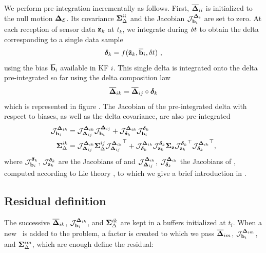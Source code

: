 We perform pre-integration incrementally as follows. 
First, $\overline{{\bm \Delta}}_{ii}$ is initialized to the null motion ${\bm \Delta}_{\mathcal{E}}$. 
Its covariance ${\bm \Sigma}_\Delta^{ii}$ and the Jacobian ${\mathcal{J}^{{\bm \Delta}_i}_{{\bf b}_i}}$ are set to zero. 
At each reception of sensor data $\tilde{{\bf z}}_k$ at $t_k$, we integrate during $\delta t$ to obtain the delta corresponding to a single data sample
%
\begin{equation}
    \bm\delta_k = f(\tilde{{\bf z}}_k, \overline{{\bf b}}_i, \delta t)~, 
    \label{eq:data2delta}
\end{equation}
%
using the bias $\overline{{\bf b}}_i$ available in KF $i$. 
This single delta is integrated onto the delta pre-integrated so far using the delta composition law
%
\begin{equation}
    \overline{{\bm \Delta}}_{ik} = \overline{{\bm \Delta}}_{ij} \circ \bm\delta_k 
    \label{eq:deltaPlusDelta}
\end{equation}
%
which is represented in figure .
The Jacobian of the pre-integrated delta with respect to biases, as well as the delta covariance, are also pre-integrated
%
\begin{align}
    {\mathcal{J}^{{\bm \Delta}_{ik}}_{{\bf b}_i}} &= {\mathcal{J}^{{\bm \Delta}_{ik}}_{{\bm \Delta}_{ij}}}{\mathcal{J}^{{\bm \Delta}_{ij}}_{{\bf b}_i}} 
+ {\mathcal{J}^{{\bm \Delta}_{ik}}_{\bm\delta_k}}{\mathcal{J}^{\bm\delta_k}_{{\bf b}_i}} \\
    {\bm \Sigma}_\Delta^{ik} &= {\mathcal{J}^{{\bm \Delta}_{ik}}_{{\bm \Delta}_{ij}}}{\bm \Sigma}_\Delta^{ij}{\mathcal{J}^{{\bm \Delta}_{ik}}_{{\bm \Delta}_{ij}}}^{\top} 
+ {\mathcal{J}^{{\bm \Delta}_{ik}}_{\bm\delta_k}}{\mathcal{J}^{\bm\delta_k}_{{\bf z}_k}}{\bm \Sigma}_{\bf z}{\mathcal{J}^{\bm\delta_k}_{{\bf z}_k}}^{\top}{\mathcal{J}^{{\bm \Delta}_{ik}}_{\bm\delta_k}}^{\top},
\end{align}
%
where ${\mathcal{J}^{\bm\delta_k}_{{\bf b}_i}}$, ${\mathcal{J}^{\bm\delta_k}_{{\bf z}_k}}$ are the Jacobians of  and ${\mathcal{J}^{{\bm \Delta}_{ik}}_{{\bm \Delta}_{ij}}}$, ${\mathcal{J}^{{\bm \Delta}_{ik}}_{\bm\delta_k}}$ the Jacobians of , computed according to Lie theory \cite{sola2018micro}, to which we give a brief introduction in .



\subsection{Residual definition}
\label{sec:preint_residual}

The successive $\overline{{\bm \Delta}}_{ik}$, ${\mathcal{J}^{{\bm \Delta}_{ik}}_{{\bf b}_i}}$, and ${\bm \Sigma}_\Delta^{ik}$ are kept in a buffers initialized at $t_i$. When a new \keyframe\ is added to the problem,
a factor is created to which we pass $\overline{{\bm \Delta}}_{im}$, ${\mathcal{J}^{{\bm \Delta}_{im}}_{{\bf b}_i}}$, and ${\bm \Sigma}_\Delta^{im}$, which are enough define the residual:

